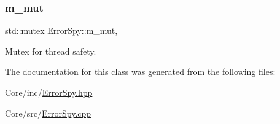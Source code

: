 \mbox{\label{class_error_spy_ae7d03be7562c1eb3ed4de48e33d89070}} 
\subsubsection{\texorpdfstring{m\+\_\+mut}{m\_mut}}
{\footnotesize\ttfamily std\+::mutex Error\+Spy\+::m\+\_\+mut\hspace{0.3cm}{\ttfamily [mutable]}, {\ttfamily [private]}}



Mutex for thread safety. 



The documentation for this class was generated from the following files\+:\begin{DoxyCompactItemize}
\item 
Core/inc/\hyperlink{_error_spy_8hpp}{Error\+Spy.\+hpp}\item 
Core/src/\hyperlink{_error_spy_8cpp}{Error\+Spy.\+cpp}\end{DoxyCompactItemize}

